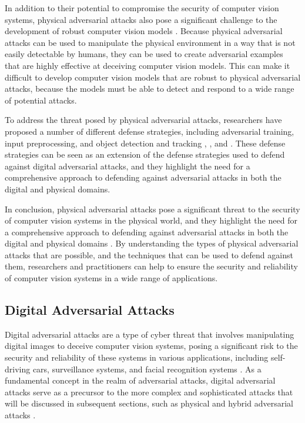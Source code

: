 \documentclass[11pt]{article}
\begin{document}
In addition to their potential to compromise the security of computer vision systems, physical adversarial attacks also pose a significant challenge to the development of robust computer vision models \cite{ref13}. Because physical adversarial attacks can be used to manipulate the physical environment in a way that is not easily detectable by humans, they can be used to create adversarial examples that are highly effective at deceiving computer vision models. This can make it difficult to develop computer vision models that are robust to physical adversarial attacks, because the models must be able to detect and respond to a wide range of potential attacks.

To address the threat posed by physical adversarial attacks, researchers have proposed a number of different defense strategies, including adversarial training, input preprocessing, and object detection and tracking \cite{ref39}, \cite{ref64}, and \cite{ref65}. These defense strategies can be seen as an extension of the defense strategies used to defend against digital adversarial attacks, and they highlight the need for a comprehensive approach to defending against adversarial attacks in both the digital and physical domains.

In conclusion, physical adversarial attacks pose a significant threat to the security of computer vision systems in the physical world, and they highlight the need for a comprehensive approach to defending against adversarial attacks in both the digital and physical domains \cite{ref4}. By understanding the types of physical adversarial attacks that are possible, and the techniques that can be used to defend against them, researchers and practitioners can help to ensure the security and reliability of computer vision systems in a wide range of applications.

\subsection{Digital Adversarial Attacks}

Digital adversarial attacks are a type of cyber threat that involves manipulating digital images to deceive computer vision systems, posing a significant risk to the security and reliability of these systems in various applications, including self-driving cars, surveillance systems, and facial recognition systems \cite{ref66}. As a fundamental concept in the realm of adversarial attacks, digital adversarial attacks serve as a precursor to the more complex and sophisticated attacks that will be discussed in subsequent sections, such as physical and hybrid adversarial attacks \cite{ref6}.
\end{document}
